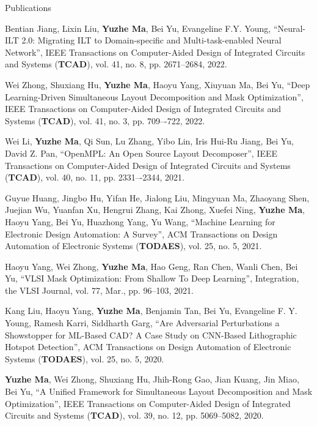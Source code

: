 \begin{rSection}{Publications}
\begin{etaremune}
\item {
    Bentian Jiang, Lixin Liu, \textbf{Yuzhe Ma}, Bei Yu, Evangeline F.Y. Young,
    ``Neural-ILT 2.0: Migrating ILT to Domain-specific and Multi-task-enabled Neural Network'',
    IEEE Transactions on Computer-Aided Design of Integrated Circuits and Systems (\textbf{TCAD}), vol. 41, no. 8, pp. 2671--2684, 2022.
}

\item {
    Wei Zhong, Shuxiang Hu, \textbf{Yuzhe Ma}, Haoyu Yang, Xiuyuan Ma, Bei Yu,
    ``Deep Learning-Driven Simultaneous Layout Decomposition and Mask Optimization'',
    IEEE Transactions on Computer-Aided Design of Integrated Circuits and Systems (\textbf{TCAD}),  vol. 41, no. 3, pp. 709–-722, 2022. 
}

\item{
    Wei Li, \textbf{Yuzhe Ma}, Qi Sun, Lu Zhang, Yibo Lin, Iris Hui-Ru Jiang, Bei Yu, David Z. Pan,
    ``OpenMPL: An Open Source Layout Decomposer'',
    IEEE Transactions on Computer-Aided Design of Integrated Circuits and Systems (\textbf{TCAD}), vol. 40, no. 11, pp. 2331–-2344, 2021.
}

\item {
        Guyue Huang, Jingbo Hu, Yifan He, Jialong Liu, Mingyuan Ma, Zhaoyang Shen, Juejian Wu, Yuanfan Xu, Hengrui Zhang, Kai Zhong, Xuefei Ning, \textbf{Yuzhe Ma}, Haoyu Yang, Bei Yu, Huazhong Yang, Yu Wang,
        ``Machine Learning for Electronic Design Automation: A Survey'',
        ACM Transactions on Design Automation of Electronic Systems (\textbf{TODAES}), vol. 25, no. 5, 2021.
}

\item{
        Haoyu Yang, Wei Zhong, \textbf{Yuzhe Ma}, Hao Geng, Ran Chen, Wanli Chen, Bei Yu,
        ``VLSI Mask Optimization: From Shallow To Deep Learning'',
        Integration, the VLSI Journal, vol. 77, Mar., pp. 96–103, 2021.
    }

\item{
        Kang Liu, Haoyu Yang, \textbf{Yuzhe Ma}, Benjamin Tan, Bei Yu, Evangeline F. Y. Young, Ramesh Karri, Siddharth Garg,
        ``Are Adversarial Perturbations a Showstopper for ML-Based CAD? A Case Study on CNN-Based Lithographic Hotspot Detection'',
        ACM Transactions on Design Automation of Electronic Systems (\textbf{TODAES}), vol. 25, no. 5, 2020.
}


\item{
        \textbf{Yuzhe Ma}, Wei Zhong, Shuxiang Hu, Jhih-Rong Gao, Jian Kuang, Jin Miao, Bei Yu,
        ``A Unified Framework for Simultaneous Layout Decomposition and Mask Optimization'',
        IEEE Transactions on Computer-Aided Design of Integrated Circuits and Systems (\textbf{TCAD}), vol. 39, no. 12, pp. 5069--5082, 2020.
}


\end{etaremune}
\end{rSection}

